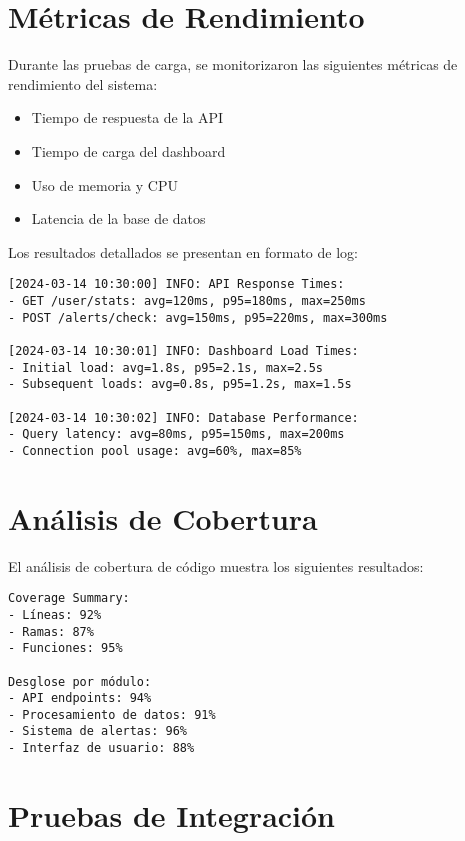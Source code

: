 \section{Métricas de Rendimiento}
\label{anexo:pruebas:rendimiento}

Durante las pruebas de carga, se monitorizaron las siguientes métricas de rendimiento del sistema:

\begin{itemize}
    \item Tiempo de respuesta de la API
    \item Tiempo de carga del dashboard
    \item Uso de memoria y CPU
    \item Latencia de la base de datos
\end{itemize}

Los resultados detallados se presentan en formato de log:

\begin{verbatim}
[2024-03-14 10:30:00] INFO: API Response Times:
- GET /user/stats: avg=120ms, p95=180ms, max=250ms
- POST /alerts/check: avg=150ms, p95=220ms, max=300ms

[2024-03-14 10:30:01] INFO: Dashboard Load Times:
- Initial load: avg=1.8s, p95=2.1s, max=2.5s
- Subsequent loads: avg=0.8s, p95=1.2s, max=1.5s

[2024-03-14 10:30:02] INFO: Database Performance:
- Query latency: avg=80ms, p95=150ms, max=200ms
- Connection pool usage: avg=60%, max=85%
\end{verbatim}

\section{Análisis de Cobertura}
\label{anexo:pruebas:cobertura}

El análisis de cobertura de código muestra los siguientes resultados:

\begin{verbatim}
Coverage Summary:
- Líneas: 92%
- Ramas: 87%
- Funciones: 95%

Desglose por módulo:
- API endpoints: 94%
- Procesamiento de datos: 91%
- Sistema de alertas: 96%
- Interfaz de usuario: 88%
\end{verbatim}

\section{Pruebas de Integración}
\label{anexo:pruebas:integracion}

